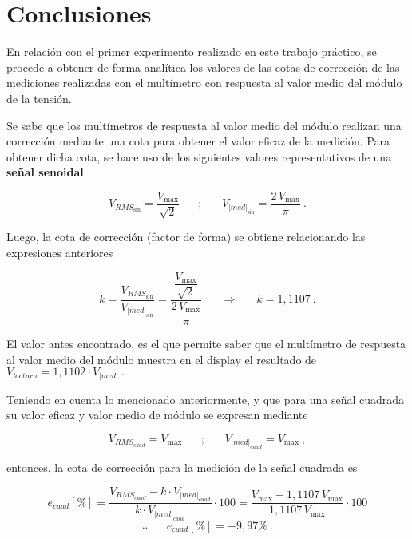   \section{Conclusiones}
    En relación con el primer experimento realizado en este trabajo
    práctico, se procede a obtener de forma analítica los valores
    de las cotas de corrección de las mediciones realizadas con
    el multímetro con respuesta al valor medio del módulo de la 
    tensión.
    
    Se sabe que los multímetros de respuesta al valor medio del
    módulo realizan una corrección mediante una cota para obtener 
    el valor eficaz de la medición. Para obtener dicha cota, se 
    hace uso de los siguientes valores representativos de una 
    \textbf{señal senoidal}

    \vspace{-5pt}
    $$ V_{RMS_{\sin}} = \dfrac{V_{\max}}{\sqrt{2}} \hspace{20pt} ; 
    \hspace{20pt} V_{|med|_{\sin}} = \dfrac{2\, V_{\max}}{\pi}~. $$

    \noindent Luego, la cota de corrección (factor de forma) se obtiene
    relacionando las expresiones anteriores
    
    \vspace{-5pt}
     $$ k = \dfrac{V_{RMS_{\sin}}}{V_{|med|_{\sin}}} 
        = \dfrac{\dfrac{V_{\max}}{\sqrt{2}}}{\dfrac{2\, V_{\max}}{\pi}}
        \hspace{20pt} \Longrightarrow \hspace{20pt} k = 1,1107~.$$

    El valor antes encontrado, es el que permite saber que el multímetro
    de respuesta al valor medio del módulo muestra en el display el 
    resultado de $ V_{lectura} = 1,1102 \cdot V_{|med|}~. $

    Teniendo en cuenta lo mencionado anteriormente, y que para una señal cuadrada
    su valor eficaz y valor medio de módulo se expresan mediante

    \vspace{-5pt}
    $$ V_{RMS_{cuad}} = V_{\max} \hspace{20pt} ; \hspace{20pt} V_{|med|_{cuad}} = V_{\max}~, $$

    \noindent entonces, la cota de corrección para la medición de 
    la señal cuadrada es

    \vspace{-5pt}
    $$ e_{cuad} [\%] = \dfrac{V_{RMS_{cuad}} - k\cdot V_{|med|_{cuad}}}{k \cdot V_{|med|_{cuad}}} \cdot 100
              = \dfrac{V_{\max} - 1,1107\, V_{\max}}{1,1107\, V_{\max}} \cdot 100 $$
              $$  \therefore \hspace{20pt} \boxed{e_{cuad}[\%] = -9,97\%}~.
    $$

